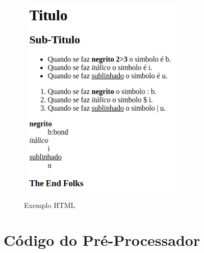 \documentclass{report}
\begin{document}
\begin{figure}[h]
\centering
\includegraphics[width=8cm,height= 10cm]{HTML.png}
\caption{Exemplo HTML}
\label{HTML}
\end{figure}


\chapter{Código do Pré-Processador}
\end{document}
